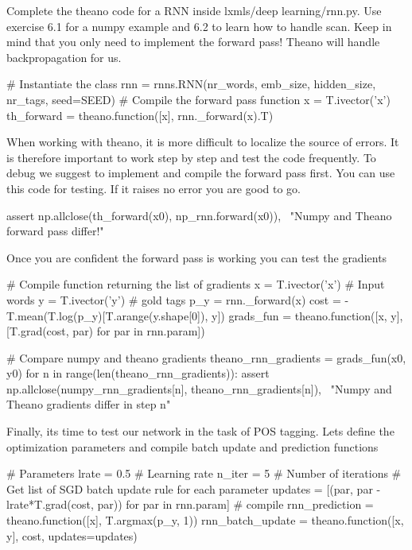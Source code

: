 \begin{exercise}
Complete the theano code for a RNN inside lxmls/deep learning/rnn.py. Use
exercise 6.1 for a numpy example and 6.2 to learn how to handle scan. Keep in
mind that you only need to implement the forward pass! Theano will handle
backpropagation for us. 
\begin{python}
# Instantiate the class
rnn = rnns.RNN(nr_words, emb_size, hidden_size, nr_tags, seed=SEED)
# Compile the forward pass function
x = T.ivector('x')
th_forward = theano.function([x], rnn._forward(x).T)
\end{python}
When working with theano, it is more difficult to localize the source of
errors. It is therefore important to work step by step and test the
code frequently. To debug we suggest to implement and compile the forward pass
first. You can use this code for testing. If it raises no error you are good to
go.
\begin{python}
assert np.allclose(th_forward(x0), np_rnn.forward(x0)), \
    "Numpy and Theano forward pass differ!"
\end{python}
Once you are confident the forward pass is working you can test the gradients
\begin{python}
# Compile function returning the list of gradients
x = T.ivector('x')     # Input words
y = T.ivector('y')     # gold tags 
p_y = rnn._forward(x)
cost = -T.mean(T.log(p_y)[T.arange(y.shape[0]), y])
grads_fun = theano.function([x, y], [T.grad(cost, par) for par in rnn.param])
\end{python}

\begin{python}
# Compare numpy and theano gradients
theano_rnn_gradients = grads_fun(x0, y0)
for n in range(len(theano_rnn_gradients)): 
    assert np.allclose(numpy_rnn_gradients[n], theano_rnn_gradients[n]), \
        "Numpy and Theano gradients differ in step n"
\end{python}

\noindent Finally, its time to test our network in the task of POS tagging. Lets define
the optimization parameters and compile batch update and prediction
functions

\begin{python}
# Parameters
lrate = 0.5   # Learning rate
n_iter = 5    # Number of iterations
# Get list of SGD batch update rule for each parameter
updates = [(par, par - lrate*T.grad(cost, par)) for par in rnn.param]
# compile
rnn_prediction = theano.function([x], T.argmax(p_y, 1))
rnn_batch_update = theano.function([x, y], cost, updates=updates)
\end{python}


\end{exercise}
